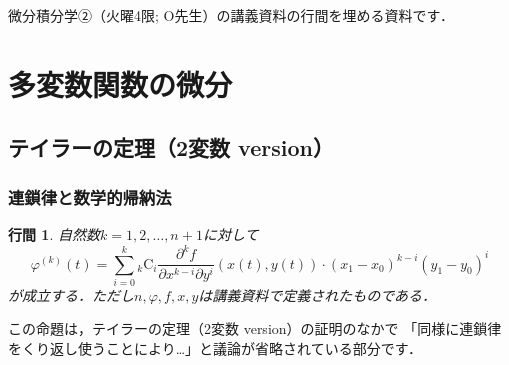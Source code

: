 \documentclass{jsarticle}
\newtheorem{proposition}{行間}
\newcommand{\combination}[2]{{}_{#1} \mathrm{C}_{#2}}
\begin{document}
微分積分学②（火曜4限; O先生）の講義資料の行間を埋める資料です．
\tableofcontents
\newpage

\setcounter{section}{1}
\section{多変数関数の微分}
\setcounter{subsection}{7}
\subsection{テイラーの定理（2変数 version）}

\subsubsection{連鎖律と数学的帰納法}
\begin{screen}
    \begin{proposition}
        自然数$k=1,2,\dots,n+1$に対して
        \begin{equation}
            \label{proposition:1}
            \varphi^{(k)}(t)
            =
            \sum_{i=0}^{k}
                \combination{k}{i}
                \frac{\partial^k f}{\partial x^{k-i} \partial y^{i}} (x(t), y(t))
                \cdot
                (x_1 - x_0)^{k-i}
                (y_1 - y_0)^{i}
        \end{equation}
        が成立する．ただし$n, \varphi, f, x, y$は講義資料で定義されたものである．
    \end{proposition}
\end{screen}

この命題は，テイラーの定理（2変数 version）の証明のなかで
「同様に連鎖律をくり返し使うことにより…」と議論が省略されている部分です．
\end{document}
